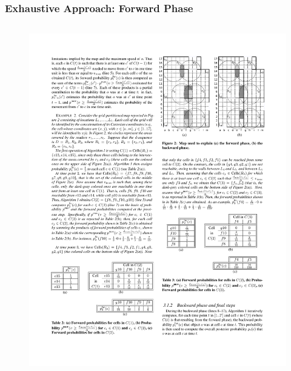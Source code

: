 
\begin{frame}
\frametitle{Exhaustive Approach: Forward Phase}

\begin{columns}

\begin{figure}[tb]
  \includegraphics[width=\columnwidth]{figures/3-4/3-4-17.pdf}
\end{figure}


\end{columns}
\end{frame}
